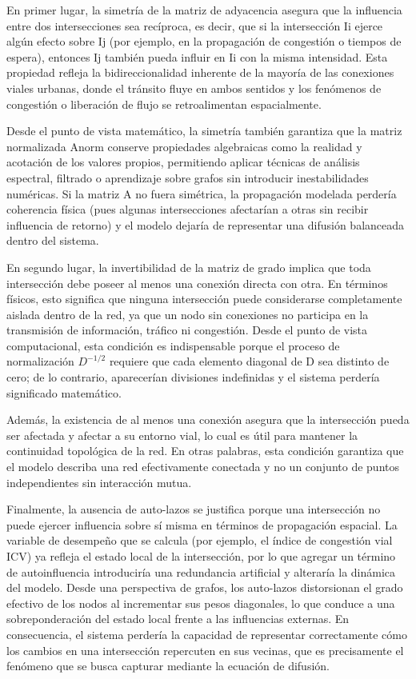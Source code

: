 \documentclass[12pt,a4paper,oneside]{report}
\begin{document}
En primer lugar, la simetría de la matriz de adyacencia asegura que la influencia entre dos intersecciones sea recíproca, es decir, que si la intersección Ii\hspace{0pt} ejerce algún efecto sobre Ij\hspace{0pt} (por ejemplo, en la propagación de congestión o tiempos de espera), entonces Ij\hspace{0pt} también pueda influir en Ii\hspace{0pt} con la misma intensidad. Esta propiedad refleja la bidireccionalidad inherente de la mayoría de las conexiones viales urbanas, donde el tránsito fluye en ambos sentidos y los fenómenos de congestión o liberación de flujo se retroalimentan espacialmente.

Desde el punto de vista matemático, la simetría también garantiza que la matriz normalizada Anorm conserve propiedades algebraicas como la realidad y acotación de los valores propios, permitiendo aplicar técnicas de análisis espectral, filtrado o aprendizaje sobre grafos sin introducir inestabilidades numéricas. Si la matriz A no fuera simétrica, la propagación modelada perdería coherencia física (pues algunas intersecciones afectarían a otras sin recibir influencia de retorno) y el modelo dejaría de representar una difusión balanceada dentro del sistema.

En segundo lugar, la invertibilidad de la matriz de grado implica que toda intersección debe poseer al menos una conexión directa con otra. En términos físicos, esto significa que ninguna intersección puede considerarse completamente aislada dentro de la red, ya que un nodo sin conexiones no participa en la transmisión de información, tráfico ni congestión. Desde el punto de vista computacional, esta condición es indispensable porque el proceso de normalización \(D^{- 1/2}\) requiere que cada elemento diagonal de D sea distinto de cero; de lo contrario, aparecerían divisiones indefinidas y el sistema perdería significado matemático.

Además, la existencia de al menos una conexión asegura que la intersección pueda ser afectada y afectar a su entorno vial, lo cual es útil para mantener la continuidad topológica de la red. En otras palabras, esta condición garantiza que el modelo describa una red efectivamente conectada y no un conjunto de puntos independientes sin interacción mutua.

Finalmente, la ausencia de auto-lazos se justifica porque una intersección no puede ejercer influencia sobre sí misma en términos de propagación espacial. La variable de desempeño que se calcula (por ejemplo, el índice de congestión vial ICV) ya refleja el estado local de la intersección, por lo que agregar un término de autoinfluencia introduciría una redundancia artificial y alteraría la dinámica del modelo. Desde una perspectiva de grafos, los auto-lazos distorsionan el grado efectivo de los nodos al incrementar sus pesos diagonales, lo que conduce a una sobreponderación del estado local frente a las influencias externas. En consecuencia, el sistema perdería la capacidad de representar correctamente cómo los cambios en una intersección repercuten en sus vecinas, que es precisamente el fenómeno que se busca capturar mediante la ecuación de difusión.
\end{document}
